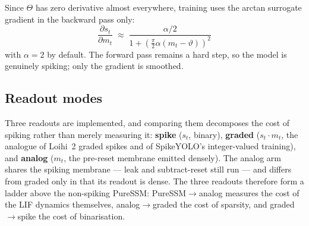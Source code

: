 \documentclass[11pt, a4paper]{report}
\begin{document}
Since $\Theta$ has zero derivative almost everywhere, training uses the arctan surrogate gradient in
the backward pass only:
\begin{equation}
  \frac{\partial s_t}{\partial m_t} \;\approx\; \frac{\alpha/2}{1 + \left(\tfrac{\pi}{2}\alpha (m_t-\vartheta)\right)^2}
  \label{eq:surrogate}
\end{equation}
with $\alpha = 2$ by default. The forward pass remains a hard step, so the model is genuinely spiking;
only the gradient is smoothed.

\subsection{Readout modes}
\label{subsec:readout_modes}
Three readouts are implemented, and comparing them decomposes the cost of spiking rather than merely
measuring it: \textbf{spike} ($s_t$, binary), \textbf{graded} ($s_t \cdot m_t$, the analogue of Loihi~2
graded spikes and of SpikeYOLO's integer-valued training), and \textbf{analog} ($m_t$, the
pre-reset membrane emitted densely). The analog arm shares the spiking membrane --- leak and subtract-reset
still run --- and differs from graded only in that its readout is dense. The three readouts therefore form a
ladder above the non-spiking PureSSM: PureSSM$\to$analog measures the cost of the LIF dynamics themselves,
analog$\to$graded the cost of sparsity, and graded$\to$spike the cost of binarisation.
\end{document}
